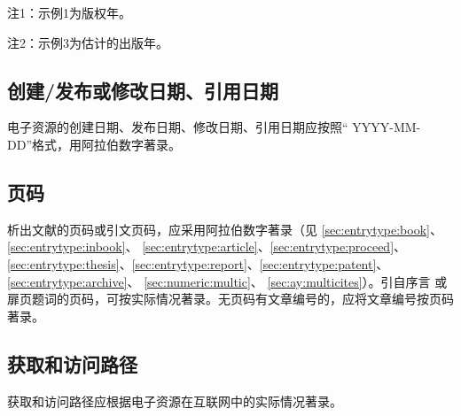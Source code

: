 \documentclass[twoside]{article}%
\begin{document}
\mbox{}{\small 注1：示例1为版权年。\par}

\mbox{}{\small 注2：示例3为估计的出版年。 \par}




\subsection{创建/发布或修改日期、引用日期}\label{sec:date:pub}

电子资源的创建日期、发布日期、修改日期、引用日期应按照“ YYYY-MM-DD”格式，用阿拉伯数字著录。
\begin{refsection}
\nocite{egbookpubdateg--}

{}
\end{refsection}

\subsection{页码}\label{sec:item:pages}
析出文献的页码或引文页码，应采用阿拉伯数字著录（见 \ref{sec:entrytype:book}、\ref{sec:entrytype:inbook}、 \ref{sec:entrytype:article}、\ref{sec:entrytype:proceed}、 \ref{sec:entrytype:thesis}、\ref{sec:entrytype:report}、\ref{sec:entrytype:patent}、\ref{sec:entrytype:archive}、 \ref{sec:numeric:multic}、 \ref{sec:ay:multicites}）。引自序言
或扉页题词的页码，可按实际情况著录。无页码有文章编号的，应将文章编号按页码著录。

\begin{refsection}
\nocite{曹凌2011-19-}
\nocite{钱学森2001--}
\nocite{冯友兰2008--}
\nocite{李约瑟1991--}
\nocite{DUNBAR2013--}
\nocite{MAURYA2023}

{\printbibliography[heading=none,env=exampleenv]}
\end{refsection}


\subsection{获取和访问路径}
获取和访问路径应根据电子资源在互联网中的实际情况著录。

\begin{refsection}

\nocite{储大同2010-721-724,gbt7714.7.8:2} %

{\printbibliography[heading=none,env=exampleenv]}
\end{refsection}
\end{document}
